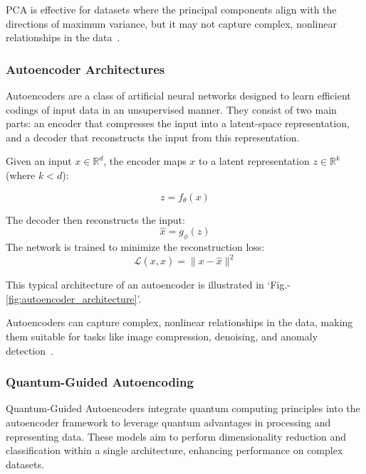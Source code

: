 \documentclass[conference]{IEEEtran}
\begin{document}
PCA is effective for datasets where the principal components 
align with the directions of maximum variance, but it may not 
capture complex, nonlinear relationships in the data~\cite{jolliffePrincipalComponentAnalysis2016}.

\subsubsection{Autoencoder Architectures}
Autoencoders are a class of artificial neural networks 
designed to learn efficient codings of input data in an 
unsupervised manner. They consist of two main parts: an 
encoder that compresses the input into a latent-space 
representation, and a decoder that reconstructs the input 
from this representation.

Given an input \( x \in \mathbb{R}^d \), the encoder maps 
\( x \) to a latent representation \( z \in \mathbb{R}^k \) 
(where \( k < d \)):

\begin{equation}
    z = f_\theta(x)
\end{equation}

The decoder then reconstructs the input:
\begin{equation}
    \hat{x} = g_\phi(z)
\end{equation}
The network is trained to minimize the reconstruction loss:
\begin{equation}
    \mathcal{L}(x, \hat{x}) = \| x - \hat{x} \|^2
\end{equation}

This typical architecture of an autoencoder is illustrated in 
`Fig.-\ref{fig:autoencoder_architecture}'.




Autoencoders can capture complex, nonlinear 
relationships in the data, making them suitable for tasks 
like image compression, denoising, and anomaly 
detection~\cite{hintonReducingDimensionalityData2006, estevaGuideDeepLearning2019}.

\subsubsection{Quantum-Guided Autoencoding}
Quantum-Guided Autoencoders integrate quantum 
computing principles into the autoencoder framework 
to leverage quantum advantages in processing and 
representing data. These models aim to perform 
dimensionality reduction and classification within a 
single architecture, enhancing performance on complex 
datasets.
\end{document}
